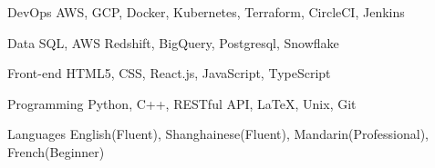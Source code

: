 

\begin{cvskills}

  \cvskill
    {DevOps} %
    {AWS, GCP, Docker, Kubernetes, Terraform, CircleCI, Jenkins} %

  \cvskill
    {Data} %
    {SQL, AWS Redshift, BigQuery, Postgresql, Snowflake} %

  \cvskill
    {Front-end} %
    {HTML5, CSS, React.js, JavaScript, TypeScript} %

  \cvskill
    {Programming} %
    {Python, C++, RESTful API, LaTeX, Unix, Git} %

  \cvskill
    {Languages} %
    {English(Fluent), Shanghainese(Fluent), Mandarin(Professional), French(Beginner)} %

\end{cvskills}
